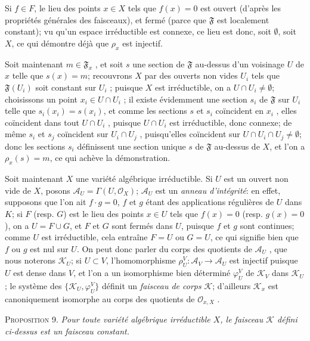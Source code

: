 Si $f \in F$, le lieu des points $x \in X$ tels que $f(x) = 0$ est ouvert (d'après les propriétés générales des faisceaux), et fermé (parce que $\mathfrak{F}$ est localement constant); vu qu'un espace irréductible est connexe, ce lieu est donc, soit $\emptyset$, soit $X$, ce qui démontre déjà que $\rho_x$ est injectif.

Soit maintenant $m \in \mathfrak{F}_x$ , et soit $s$ une section de $\mathfrak{F}$ au-dessus d'un voisinage $U$ de $x$ telle que $s(x) = m$; recouvrons $X$ par des ouverts non vides $U_i$ tels que $\mathfrak{F}(U_i)$ soit constant sur $U_i$ ; puisque $X$ est irréductible, on a $U \cap U_i \neq \emptyset$; choisissons un point $x_i \in U \cap U_i$ ; il existe évidemment une section $s_i$ de $\mathfrak{F}$ sur $U_i$ telle que $s_i(x_i) = s(x_i)$, et comme les sections $s$ et $s_i$ coïncident en $x_i$ , elles coïncident dans tout $U \cap U_i$ , puisque $U \cap U_i$ est irréductible, donc connexe; de même $s_i$ et $s_j$ coïncident sur $U_i \cap U_j$ , puisqu'elles coïncident sur $U \cap U_i \cap U_j \neq \emptyset$; donc les sections $s_i$ définissent une section unique $s$ de $\mathfrak{F}$ au-dessus de $X$, et l'on a $\rho_x(s) = m$, ce qui achève la démonstration.

Soit maintenant $X$ une variété algébrique irréductible. Si $U$ est un ouvert non vide de $X$, posons $\mathcal{A}_U = \Gamma(U, \mathcal{O}_X)$; $\mathcal{A}_U$ est un \textit{anneau d'intégrité}: en effet, supposons que l'on ait $f \cdot g = 0$, $f$ et $g$ étant des applications régulières de $U$ dans $K$; si $F$ (resp. $G$) est le lieu des points $x \in U$ tels que $f(x) = 0$ (resp. $g(x) = 0$), on a $U = F \cup G$, et $F$ et $G$ sont fermés dans $U$, puisque $f$ et $g$ sont continues; comme $U$ est irréductible, cela entraîne $F = U$ ou $G = U$, ce qui signifie bien que $f$ ou $g$ est nul sur $U$. On peut donc parler du corps des quotients de $\mathcal{A}_U$ , que nous noterons $\mathcal{K}_U$; si $U \subset V$, l'homomorphisme $\rho_U^V\colon \mathcal{A}_V \to \mathcal{A}_U$ est injectif puisque $U$ est dense dans $V$, et l'on a un isomorphisme bien déterminé $\varphi_U^V$ de $\mathcal{K}_V$ dans $\mathcal{K}_U$ ; le système des $\{\mathcal{K}_U , \varphi_U^V\}$ définit un \textit{faisceau de corps} $\mathcal{K}$; d'ailleurs $\mathcal{K}_x$ est canoniquement isomorphe au corps des quotients de $\mathcal{O}_{x,X}$ .

\textsc{Proposition} 9. \textit{Pour toute variété algébrique irréductible $X$, le faisceau $\mathcal{K}$ défini ci-dessus est un faisceau constant.}

